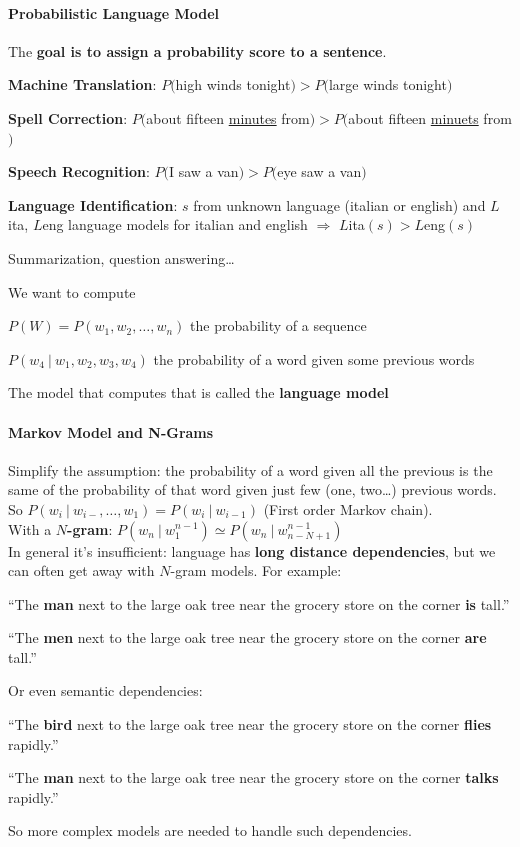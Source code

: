 \documentclass[10pt]{report}
\begin{document}
\paragraph{Probabilistic Language Model} The \textbf{goal is to assign a probability score to a sentence}.
\begin{list}{}{}
	\item \textbf{Machine Translation}: $P($high winds tonight$) > P($large winds tonight$)$
	\item \textbf{Spell Correction}: $P($about fifteen \underline{minutes} from$) > P($about fifteen \underline{minuets} from$)$
	\item \textbf{Speech Recognition}: $P($I saw a van$) > P($eye saw a van$)$
	\item \textbf{Language Identification}: $s$ from unknown language (italian or english) and $L$ita, $L$eng language models for italian and english $\Rightarrow$ $L$ita$(s) > L$eng$(s)$
	\item Summarization, question answering\ldots
\end{list}
We want to compute \begin{list}{}{}
	\item $P(W) = P(w_1,w_2,\ldots,w_n)$ the probability of a sequence
	\item $P(w_4\:|\:w_1,w_2,w_3,w_4)$ the probability of a word given some previous words
\end{list}
The model that computes that is called the \textbf{language model}
\paragraph{Markov Model and N-Grams} Simplify the assumption: the probability of a word given all the previous is the same of the probability of that word given just few (one, two\ldots) previous words. So $P(w_i\:|\:w_{i-},\ldots,w_1) = P(w_i\:|\:w_{i-1})$ (First order Markov chain).\\
With a \textbf{$N$-gram}: $P(w_n\:|\:w_1^{n-1}) \simeq P(w_n\:|\:w_{n-N+1}^{n-1})$\\
In general it's insufficient: language has \textbf{long distance dependencies}, but we can often get away with $N$-gram models. For example:\begin{list}{}{}
	\item “The \textbf{man} next to the large oak tree near the grocery store on the corner \textbf{is} tall.”
	\item “The \textbf{men} next to the large oak tree near the grocery store on the corner \textbf{are} tall.”
\end{list}
Or even semantic dependencies:
\begin{list}{}{}
	\item “The \textbf{bird} next to the large oak tree near the grocery store on the corner \textbf{flies} rapidly.”
	\item “The \textbf{man} next to the large oak tree near the grocery store on the corner \textbf{talks} rapidly.”
\end{list}
So more complex models are needed to handle such dependencies.
\end{document}

